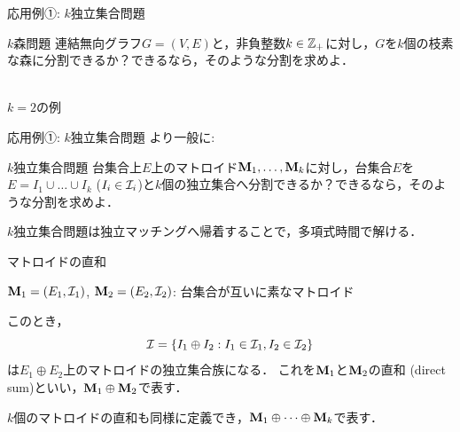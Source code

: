 \documentclass[14pt,aspectratio=169,xcolor=dvipsnames,table,onlytextwidth,dvipdfmx]{beamer}
\begin{document}
\begin{frame}{応用例①: $k$独立集合問題}

    \begin{block}{$k$森問題}
        連結無向グラフ$G = (V, E)$と，非負整数$k \in \mathbb{Z}_+$に対し，$G$を$k$個の枝素な森に分割できるか？できるなら，そのような分割を求めよ．
    \end{block}

    \begin{center}
        \\ $k = 2$の例
    \end{center}

\end{frame}

\begin{frame}{応用例①: $k$独立集合問題}
    より一般に:
    \begin{block}{$k$独立集合問題}
        台集合上$E$上のマトロイド$\mathbf{M}_1, \dots, \mathbf{M}_k$に対し，台集合$E$を$E = I_1 \cup \dots \cup I_k$ ($I_i \in \mathcal{I}_i$)と$k$個の独立集合へ分割できるか？できるなら，そのような分割を求めよ．
    \end{block}

    \vfill
    \begin{theorem}
        $k$独立集合問題は独立マッチングへ帰着することで，多項式時間で解ける．
    \end{theorem}
\end{frame}

\begin{frame}{マトロイドの直和}
        \begin{definition}
        $\mathbf{M}_1 = (E_1, \mathcal{I}_1)$, $\mathbf{M}_2 = (E_2, \mathcal{I}_2)$: 台集合が互いに素なマトロイド 

        このとき，
        \[
            \mathcal{I} = \{I_1 \oplus I_2: I_1 \in \mathcal{I}_1, I_2 \in \mathcal{I}_2 \}
        \]
        は$E_1 \oplus E_2$上のマトロイドの独立集合族になる．
        これを$\mathbf{M}_1$と$\mathbf{M}_2$の\alert{直和 (direct sum)}といい，$\mathbf{M}_1 \oplus \mathbf{M}_2$で表す．

        \bigskip
        $k$個のマトロイドの直和も同様に定義でき，$\mathbf{M}_1 \oplus \dots \oplus \mathbf{M}_k$で表す．
        \end{definition}
\end{frame}
\end{document}
